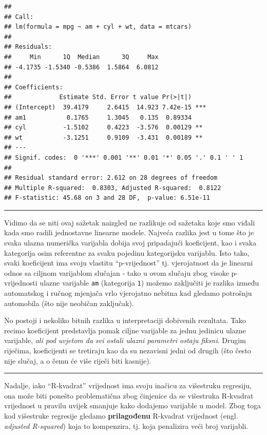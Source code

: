 \documentclass[]{book}
\theoremstyle{definition}
\theoremstyle{definition}
\theoremstyle{definition}
\theoremstyle{remark}
\begin{document}
\begin{verbatim}
## 
## Call:
## lm(formula = mpg ~ am + cyl + wt, data = mtcars)
## 
## Residuals:
##     Min      1Q  Median      3Q     Max 
## -4.1735 -1.5340 -0.5386  1.5864  6.0812 
## 
## Coefficients:
##             Estimate Std. Error t value Pr(>|t|)    
## (Intercept)  39.4179     2.6415  14.923 7.42e-15 ***
## am1           0.1765     1.3045   0.135  0.89334    
## cyl          -1.5102     0.4223  -3.576  0.00129 ** 
## wt           -3.1251     0.9109  -3.431  0.00189 ** 
## ---
## Signif. codes:  0 '***' 0.001 '**' 0.01 '*' 0.05 '.' 0.1 ' ' 1
## 
## Residual standard error: 2.612 on 28 degrees of freedom
## Multiple R-squared:  0.8303, Adjusted R-squared:  0.8122 
## F-statistic: 45.68 on 3 and 28 DF,  p-value: 6.51e-11
\end{verbatim}

\begin{center}\rule{0.5\linewidth}{\linethickness}\end{center}

Vidimo da se niti ovaj sažetak naizgled ne razlikuje od sažetaka koje
smo viđali kada smo radili jednostavne linearne modele. Najveća razlika
jest u tome što je svaka ulazna numerička varijabla dobija svoj
pripadajući koeficijent, kao i svaka kategorija osim referentne za svaku
pojedinu kategorijsku varijablu. Isto tako, svaki koeficijent ima svoju
vlastitu ``p-vrijednost'' tj. vjerojatnost da je linearni odnos sa
ciljnom varijablom slučajan - tako u ovom slučaju zbog visoke
p-vrijednosti ulazne varijable \texttt{am} (kategorija \texttt{1})
možemo zaključiti je razlika između automatskog i ručnog mjenjača vrlo
vjerojatno nebitna kad gledamo potrošnju automobila (što nije neobičan
zaključak).

No postoji i nekoliko bitnih razlika u interpretaciji dobivenih
rezultata. Tako recimo koeficijent predstavlja pomak ciljne varijable za
jednu jedinicu ulazne varijable, \emph{ali pod uvjetom da svi ostali
ulazni parametri ostaju fiksni}. Drugim riječima, koeficijenti se
tretiraju kao da su nezavisni jedni od drugih (što često nije slučaj, a
o čemu će više riječi biti kasnije).

\begin{center}\rule{0.5\linewidth}{\linethickness}\end{center}

Nadalje, iako ``R-kvadrat'' vrijednost ima svoju inačicu za višestruku
regresiju, ona može biti ponešto problematična zbog činjenice da se
višestruka R-kvadrat vrijednost u pravilu uvijek smanjuje kako dodajemo
varijable u model. Zbog toga kod višestruke regresije gledamo
\textbf{prilagođenu} R-kvadrat vrijednost (engl. \emph{adjusted
R-squared}) koja to kompenzira, tj. koja penalizira veći broj varijabli.
\end{document}

